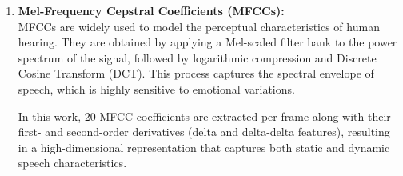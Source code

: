 \documentclass[iicol,sn-mathphys-num]{sn-jnl}%
\theoremstyle{thmstyleone}%
\theoremstyle{thmstyletwo}%
\theoremstyle{thmstylethree}%
\begin{document}
\begin{enumerate}
    
    


    \item \textbf{Mel-Frequency Cepstral Coefficients (MFCCs):}\\
MFCCs are widely used to model the perceptual characteristics of human hearing. They are obtained by applying a Mel-scaled filter bank to the power spectrum of the signal, followed by logarithmic compression and Discrete Cosine Transform (DCT). This process captures the spectral envelope of speech, which is highly sensitive to emotional variations.

In this work, 20 MFCC coefficients are extracted per frame along with their first- and second-order derivatives (delta and delta-delta features), resulting in a high-dimensional representation that captures both static and dynamic speech characteristics.

    
    

\end{enumerate}
\end{document}

